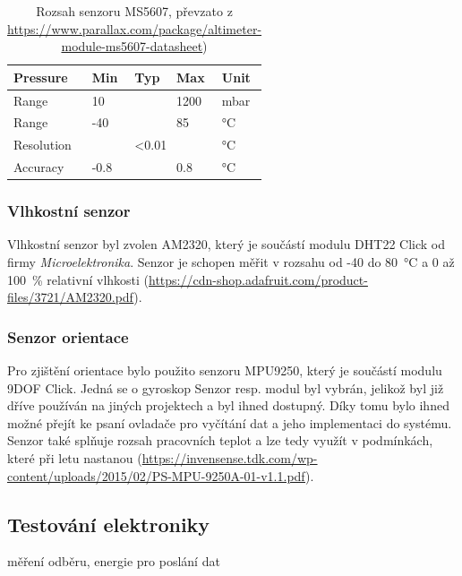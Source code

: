 \documentclass[twoside]{ctuthesis}
\theoremstyle{plain}
\theoremstyle{definition}
\theoremstyle{note}
\begin{document}
		\begin{table}[]
			\begin{tabular}{|l|lll|l|}
			\hline
			Pressure   & \multicolumn{1}{l|}{Min}  & \multicolumn{1}{l|}{Typ} & Max  & Unit \\ \hline
			Range      & \multicolumn{1}{l|}{10}   & \multicolumn{1}{l|}{}    & 1200 & mbar \\ \hline
			Range      & \multicolumn{1}{l|}{-40}  & \multicolumn{1}{l|}{}    & 85   & °C   \\ \hline
			Resolution & \multicolumn{3}{c|}{\textless{}0.01}                        & °C   \\ \hline
			Accuracy   & \multicolumn{1}{l|}{-0.8} & \multicolumn{1}{l|}{}    & 0.8  & °C   \\ \hline
			\end{tabular}
			\caption{Rozsah senzoru MS5607, převzato z \url{https://www.parallax.com/package/altimeter-module-ms5607-datasheet})}
			\label{tab:ms:range}
		\end{table}

		
		\subsubsection{Vlhkostní senzor}
		Vlhkostní senzor byl zvolen AM2320, který je součástí modulu DHT22 Click od firmy \textit{Microelektronika}. Senzor je schopen měřit v rozsahu od -40 do 80~°C a 0 až 100~\% relativní vlhkosti (\url{https://cdn-shop.adafruit.com/product-files/3721/AM2320.pdf}). 

		\subsubsection{Senzor orientace}
		Pro zjištění orientace bylo použito senzoru MPU9250, který je součástí modulu 9DOF Click. Jedná se o gyroskop Senzor resp. modul byl vybrán, jelikož byl již dříve používán na jiných projektech a byl ihned dostupný. Díky tomu bylo ihned možné přejít ke psaní ovladače pro vyčítání dat a jeho implementaci do systému. Senzor také splňuje rozsah pracovních teplot a lze tedy využít v podmínkách, které při letu nastanou (\url{https://invensense.tdk.com/wp-content/uploads/2015/02/PS-MPU-9250A-01-v1.1.pdf}).  
		
		
		
		
		\subsection{Testování elektroniky}
		měření odběru, energie pro poslání dat
\end{document}
